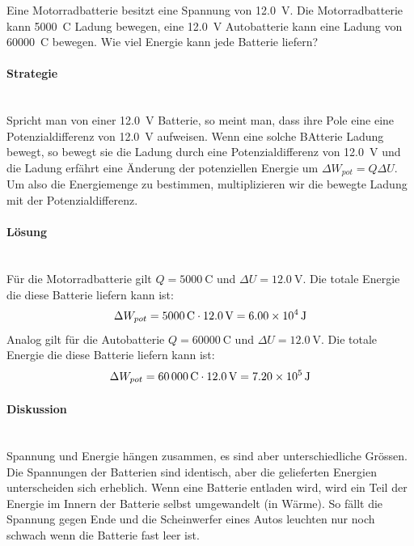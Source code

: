 \documentclass[11pt,twoside=false,open=any]{scrbook}
\begin{document}
\begin{tcolorbox}[breakable,colback=white, title=Beispiel: Berechnung einer Energiemenge]
Eine Motorradbatterie besitzt eine Spannung von \SI{12.0}{\volt}. Die Motorradbatterie kann \SI{5000}{\coulomb} Ladung bewegen, eine \SI{12.0}{\volt} Autobatterie kann eine Ladung von \SI{60000}{\coulomb} bewegen. Wie viel Energie kann jede Batterie liefern?
\paragraph{Strategie}\mbox{}\\
    Spricht man von einer \SI{12.0}{\volt} Batterie, so meint man, dass ihre Pole eine eine Potenzialdifferenz von \SI{12.0}{\volt} aufweisen. Wenn eine solche BAtterie Ladung bewegt, so bewegt sie die Ladung durch eine Potenzialdifferenz von \SI{12.0}{\volt} und die Ladung erfährt eine Änderung der potenziellen Energie um $\Delta W_{pot} = Q \Delta U$. Um also die Energiemenge zu bestimmen, multiplizieren wir die bewegte Ladung mit der Potenzialdifferenz.
\paragraph{Lösung}\mbox{}\\
    Für die Motorradbatterie gilt $Q=\SI{5000}{\coulomb}$ und $\Delta U = \SI{12.0}{\volt}$. Die totale Energie die diese Batterie liefern kann ist:
    \[ \Delta W_{pot} = \SI{5000}{\coulomb} \cdot \SI{12.0}{\volt} = \SI{6.00E4}{\joule} \]
    Analog gilt für die Autobatterie $Q=\SI{60000}{\coulomb}$ und $\Delta U = \SI{12.0}{\volt}$. Die totale Energie die diese Batterie liefern kann ist:
    \[ \Delta W_{pot} = \SI{60000}{\coulomb} \cdot \SI{12.0}{\volt} = \SI{7.20E5}{\joule} \]
\paragraph{Diskussion}\mbox{}\\
   Spannung und Energie hängen zusammen, es sind aber unterschiedliche Grössen. Die Spannungen der Batterien sind identisch, aber die gelieferten Energien unterscheiden sich erheblich. Wenn eine Batterie entladen wird, wird ein Teil der Energie im Innern der Batterie selbst umgewandelt (in Wärme). So fällt die Spannung gegen Ende und die Scheinwerfer eines Autos leuchten nur noch schwach wenn die Batterie fast leer ist.

\end{tcolorbox}
\end{document}
